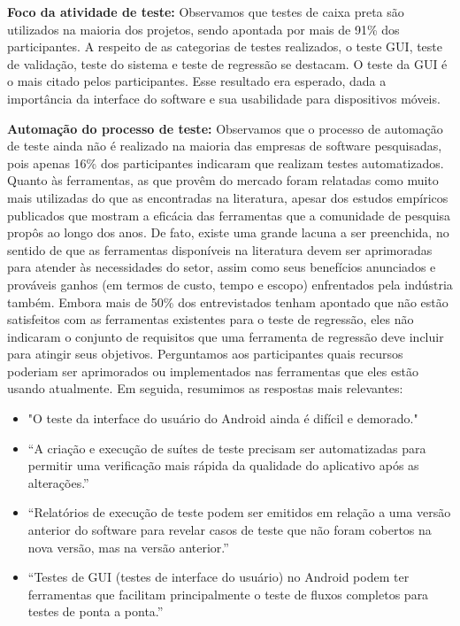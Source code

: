 \textbf{Foco da atividade de teste:} Observamos que testes de caixa preta são utilizados na maioria dos projetos, sendo apontada por mais de 91\% dos participantes. A respeito de
as categorias de testes realizados, o teste \ac{GUI}, teste de validação, teste do sistema e teste de regressão se destacam. O teste da \ac{GUI} é o mais citado pelos participantes. Esse resultado era esperado, dada a importância da interface do software e sua usabilidade para dispositivos móveis.
    
\textbf{Automação do processo de teste:} Observamos que o processo de automação de teste ainda não é realizado na maioria das empresas de software pesquisadas, pois apenas 16\% dos participantes indicaram que realizam testes automatizados. Quanto às ferramentas, as que provêm do mercado foram relatadas como muito mais utilizadas do que as encontradas na literatura, apesar dos estudos empíricos publicados que mostram a eficácia das ferramentas que a comunidade de pesquisa propôs ao longo dos anos. De fato, existe uma grande lacuna a ser preenchida, no sentido de que as ferramentas disponíveis na literatura devem ser aprimoradas para atender às necessidades do setor, assim como seus benefícios anunciados e prováveis ganhos (em termos de custo, tempo e escopo) enfrentados pela indústria também.
Embora mais de 50\% dos entrevistados tenham apontado que não estão satisfeitos com as ferramentas existentes para o teste de regressão, eles não indicaram o conjunto de requisitos que uma ferramenta de regressão deve incluir para atingir seus objetivos.
Perguntamos aos participantes quais recursos poderiam ser aprimorados ou implementados nas ferramentas que eles estão usando atualmente. Em seguida, resumimos as respostas mais relevantes:
\begin{itemize}
    \item "O teste da interface do usuário do Android ainda é difícil e demorado."
    \item “A criação e execução de suítes de teste precisam ser automatizadas para permitir uma verificação mais rápida da qualidade do aplicativo após as alterações.”
    \item “Relatórios de execução de teste podem ser emitidos em relação a uma versão anterior do software para revelar casos de teste que não foram cobertos na nova versão, mas na versão anterior.”
    \item “Testes de \ac{GUI} (testes de interface do usuário) no Android podem ter ferramentas que facilitam principalmente o teste de fluxos completos para testes de ponta a ponta.”
\end{itemize}

